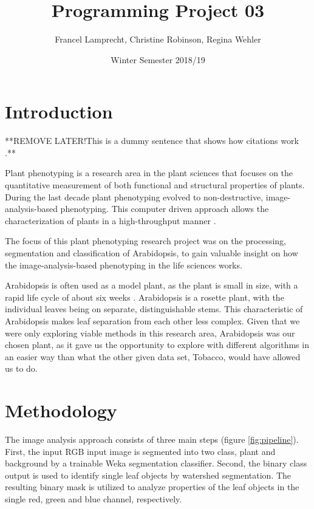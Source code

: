 \documentclass[paper=A4,bibliography=totocnumbered]{scrartcl}
\title{Programming Project 03}
\author{Francel Lamprecht, Christine Robinson, Regina Wehler}
\date{Winter Semester 2018/19}
\begin{document}
\maketitle

\tableofcontents
\clearpage
\section{Introduction}
**REMOVE LATER!This is a dummy sentence that shows how citations work \citep{Adams.2018}.**

Plant phenotyping is a research  area in the plant sciences that focuses on the quantitative measurement of both functional and structural properties of plants. During the last decade plant phenotyping evolved to non-destructive, image-analysis-based phenotyping. This computer driven approach allows the characterization of plants in a high-throughput manner \citep{Walter.2015}.

The focus of this plant phenotyping research project was on the processing, segmentation and classification of Arabidopsis, to gain valuable insight on how the image-analysis-based phenotyping in the life sciences works. 

Arabidopsis is often used as a model plant, as the plant is small in size, with a rapid life cycle of about six weeks \citep{Koornneef.2010}. Arabidopsis is a rosette plant, with the individual leaves being on separate, distinguishable stems. This characteristic of Arabidopsis makes leaf separation from each other less complex.  Given that we were only exploring viable methods in this research area, Arabidopsis was our chosen plant, as it gave us the opportunity to explore with different algorithms in an easier way than what the other given data set, Tobacco, would have allowed us to do. 



\section{Methodology}
The image analysis approach consists of three main steps (figure \ref{fig:pipeline}). First, the input RGB input image is segmented into two class, plant and background by a trainable Weka segmentation classifier. Second, the binary class output is used to identify single leaf objects by watershed segmentation. The resulting binary mask is utilized to analyze properties of the leaf objects in the single red, green and blue channel, respectively.
\end{document}
